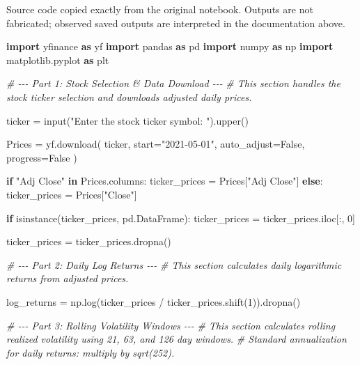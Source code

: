 \documentclass[
  11pt,
]{article}
\newenvironment{Shaded}{}{}
\newcommand{\BuiltInTok}[1]{\textcolor[rgb]{0.00,0.50,0.00}{#1}}
\newcommand{\CommentTok}[1]{\textcolor[rgb]{0.38,0.63,0.69}{\textit{#1}}}
\newcommand{\ControlFlowTok}[1]{\textcolor[rgb]{0.00,0.44,0.13}{\textbf{#1}}}
\newcommand{\DecValTok}[1]{\textcolor[rgb]{0.25,0.63,0.44}{#1}}
\newcommand{\ImportTok}[1]{\textcolor[rgb]{0.00,0.50,0.00}{\textbf{#1}}}
\newcommand{\KeywordTok}[1]{\textcolor[rgb]{0.00,0.44,0.13}{\textbf{#1}}}
\newcommand{\NormalTok}[1]{#1}
\newcommand{\OperatorTok}[1]{\textcolor[rgb]{0.40,0.40,0.40}{#1}}
\newcommand{\StringTok}[1]{\textcolor[rgb]{0.25,0.44,0.63}{#1}}
\newcommand{\VariableTok}[1]{\textcolor[rgb]{0.10,0.09,0.49}{#1}}
\begin{document}
Source code copied exactly from the original notebook. Outputs are not fabricated; observed saved outputs are interpreted in the documentation above.

\begin{Shaded}
\begin{Highlighting}[]
\ImportTok{import}\NormalTok{ yfinance }\ImportTok{as}\NormalTok{ yf}
\ImportTok{import}\NormalTok{ pandas }\ImportTok{as}\NormalTok{ pd}
\ImportTok{import}\NormalTok{ numpy }\ImportTok{as}\NormalTok{ np}
\ImportTok{import}\NormalTok{ matplotlib.pyplot }\ImportTok{as}\NormalTok{ plt}

\CommentTok{\# {-}{-}{-} Part 1: Stock Selection \& Data Download {-}{-}{-}}
\CommentTok{\# This section handles the stock ticker selection and downloads adjusted daily prices.}

\NormalTok{ticker }\OperatorTok{=} \BuiltInTok{input}\NormalTok{(}\StringTok{"Enter the stock ticker symbol: "}\NormalTok{).upper()}

\NormalTok{Prices }\OperatorTok{=}\NormalTok{ yf.download(}
\NormalTok{    ticker,}
\NormalTok{    start}\OperatorTok{=}\StringTok{"2021{-}05{-}01"}\NormalTok{,}
\NormalTok{    auto\_adjust}\OperatorTok{=}\VariableTok{False}\NormalTok{,}
\NormalTok{    progress}\OperatorTok{=}\VariableTok{False}
\NormalTok{)}

\ControlFlowTok{if} \StringTok{"Adj Close"} \KeywordTok{in}\NormalTok{ Prices.columns:}
\NormalTok{    ticker\_prices }\OperatorTok{=}\NormalTok{ Prices[}\StringTok{"Adj Close"}\NormalTok{]}
\ControlFlowTok{else}\NormalTok{:}
\NormalTok{    ticker\_prices }\OperatorTok{=}\NormalTok{ Prices[}\StringTok{"Close"}\NormalTok{]}

\ControlFlowTok{if} \BuiltInTok{isinstance}\NormalTok{(ticker\_prices, pd.DataFrame):}
\NormalTok{    ticker\_prices }\OperatorTok{=}\NormalTok{ ticker\_prices.iloc[:, }\DecValTok{0}\NormalTok{]}

\NormalTok{ticker\_prices }\OperatorTok{=}\NormalTok{ ticker\_prices.dropna()}


\CommentTok{\# {-}{-}{-} Part 2: Daily Log Returns {-}{-}{-}}
\CommentTok{\# This section calculates daily logarithmic returns from adjusted prices.}

\NormalTok{log\_returns }\OperatorTok{=}\NormalTok{ np.log(ticker\_prices }\OperatorTok{/}\NormalTok{ ticker\_prices.shift(}\DecValTok{1}\NormalTok{)).dropna()}


\CommentTok{\# {-}{-}{-} Part 3: Rolling Volatility Windows {-}{-}{-}}
\CommentTok{\# This section calculates rolling realized volatility using 21, 63, and 126 day windows.}
\CommentTok{\# Standard annualization for daily returns: multiply by sqrt(252).}


\end{Highlighting}
\end{Shaded}
\end{document}

